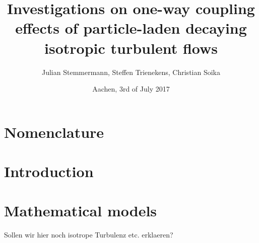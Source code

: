 \documentclass[a4paper,10pt]{article}
\title{Investigations on one-way coupling effects of particle-laden decaying isotropic turbulent flows}
\author{Julian Stemmermann, Steffen Trienekens, Christian Soika}
\date{Aachen, 3rd of July 2017}
\begin{document}
\maketitle

\pagebreak

\tableofcontents{}
 
\pagebreak

\section{Nomenclature}
\makenomenclature
\printnomenclature
\pagebreak

\section{Introduction}
\pagebreak
\section{Mathematical models}
Sollen wir hier noch isotrope Turbulenz etc. erklaeren?
\end{document}
